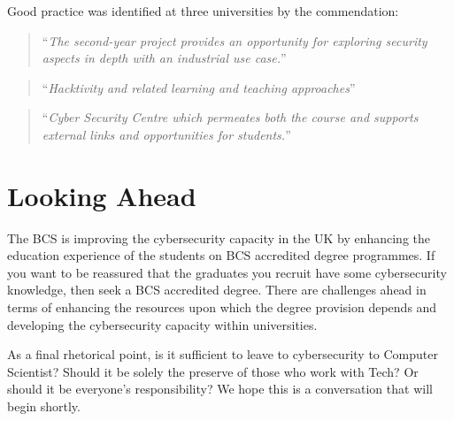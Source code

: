 \documentclass[a4paper,11pt]{article}
\begin{document}
Good practice was identified at three universities by the commendation:

 \begin{quote}
``{\emph{The second-year project provides an opportunity for exploring security aspects in depth with an industrial use case.}}''
\end{quote}
\begin{quote}
``{\emph{Hacktivity and related learning and teaching approaches}}''
\end{quote}
\begin{quote}
``{\emph{Cyber Security Centre which permeates both the course and supports external links and opportunities for students.}}''
\end{quote}


\section*{Looking Ahead}

The BCS is improving the cybersecurity capacity in the UK by enhancing the education experience of the students on BCS accredited degree programmes. If you want to be reassured that the graduates you recruit have some cybersecurity knowledge, then seek a BCS accredited degree. There are challenges ahead in terms of enhancing the resources upon which the degree provision depends and developing the cybersecurity capacity within universities.

As a final rhetorical point, is it sufficient to leave to cybersecurity to Computer Scientist? Should it be solely the preserve of those who work with Tech? Or should it be everyone's responsibility? We hope this is a conversation that will begin shortly.





\end{document}
